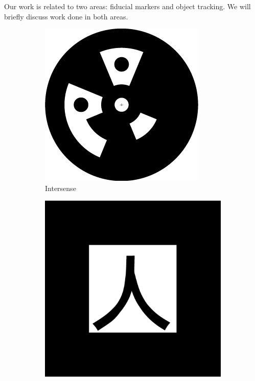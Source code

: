 \documentclass[runningheads]{llncs}
\begin{document}
Our work is related to two areas: fiducial markers and
object tracking. We will briefly discuss work done in both areas.
\begin{figure}
 \begin{subfigure}[b]{0.19\textwidth}
  \centering
  \includegraphics[width=\linewidth]{intersense.jpg}
  Intersense\cite{NaimarkF02}
 \end{subfigure}
 \begin{subfigure}[b]{0.19\textwidth}
 \centering
  \includegraphics[width=\linewidth]{pattKanji.pdf}

\end{subfigure}
\end{figure}
\end{document}
